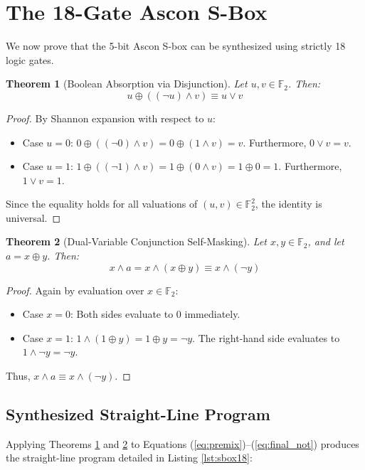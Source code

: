 \documentclass[journal,10pt]{IEEEtran}
\newtheorem{theorem}{Theorem}
\begin{document}
\section{The 18-Gate Ascon S-Box}
\label{sec:18gate}

We now prove that the 5-bit Ascon S-box can be synthesized using strictly 18 logic gates.

\begin{theorem}[Boolean Absorption via Disjunction]
\label{thm:absorption}
Let $u, v \in \mathbb{F}_2$. Then:
\begin{equation}
u \oplus ((\neg u) \land v) \equiv u \lor v
\end{equation}
\end{theorem}
\begin{proof}
By Shannon expansion with respect to $u$:
\begin{itemize}
    \item Case $u = 0$: $0 \oplus ((\neg 0) \land v) = 0 \oplus (1 \land v) = v$. Furthermore, $0 \lor v = v$.
    \item Case $u = 1$: $1 \oplus ((\neg 1) \land v) = 1 \oplus (0 \land v) = 1 \oplus 0 = 1$. Furthermore, $1 \lor v = 1$.
\end{itemize}
Since the equality holds for all valuations of $(u, v) \in \mathbb{F}_2^2$, the identity is universal.
\end{proof}

\begin{theorem}[Dual-Variable Conjunction Self-Masking]
\label{thm:self_masking}
Let $x, y \in \mathbb{F}_2$, and let $a = x \oplus y$. Then:
\begin{equation}
x \land a = x \land (x \oplus y) \equiv x \land (\neg y)
\end{equation}
\end{theorem}
\begin{proof}
Again by evaluation over $x \in \mathbb{F}_2$:
\begin{itemize}
    \item Case $x = 0$: Both sides evaluate to 0 immediately.
    \item Case $x = 1$: $1 \land (1 \oplus y) = 1 \oplus y = \neg y$. The right-hand side evaluates to $1 \land \neg y = \neg y$.
\end{itemize}
Thus, $x \land a \equiv x \land (\neg y)$.
\end{proof}

\subsection{Synthesized Straight-Line Program}
Applying Theorems \ref{thm:absorption} and \ref{thm:self_masking} to Equations (\ref{eq:premix})--(\ref{eq:final_not}) produces the straight-line program detailed in Listing \ref{lst:sbox18}:
\end{document}
